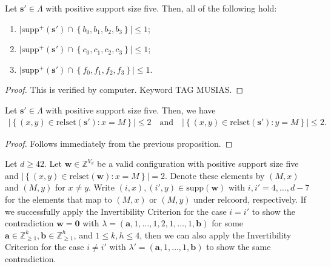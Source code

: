 \begin{proposition}
    Let \( \mathbf{s}' \in \Lambda \) with positive support size five. Then, all of the following hold:
    \begin{enumerate}
        \item \( \lvert \mathrm{supp}^+(\mathbf{s}') \cap \left\{ b_0,b_1,b_2,b_3 \right\} \rvert \leq 1 \);
        \item \( \lvert \mathrm{supp}^+(\mathbf{s}') \cap \left\{ c_0,c_1,c_2,c_3 \right\} \rvert \leq 1 \);
        \item \( \lvert \mathrm{supp}^+(\mathbf{s}') \cap \left\{ f_0,f_1,f_2,f_3 \right\} \rvert \leq 1 \).
    \end{enumerate}
\end{proposition}

\begin{proof}
    This is verified by computer. Keyword TAG MUSIAS.
\end{proof}

\begin{corollary}
    Let \( \mathbf{s}' \in \Lambda \) with positive support size five. Then, we have
    \begin{align*}
        \lvert \left\{ (x,y) \in \mathrm{relset}(\mathbf{s}') : x = M \right\} \rvert \leq 2 \quad \text{and} \quad         \lvert \left\{ (x,y) \in \mathrm{relset}(\mathbf{s}') : y = M \right\} \rvert \leq 2.
    \end{align*}
\end{corollary}

\begin{proof}
    Follows immediately from the previous proposition.
\end{proof}

\begin{proposition}
    Let \( d\geq 42 \).
    Let \( \mathbf{w} \in \mathbb{Z}^{V_d} \) be a valid configuration with positive support size five and \( \lvert \left\{ (x,y) \in \mathrm{relset}(\mathbf{w}) : x = M \right\} \rvert = 2 \).
    Denote these elements by \( (M, x) \) and \( (M, y) \) for \( x \neq y \). Write \( (i,x), (i',y) \in \mathrm{supp}(\mathbf{w}) \) with \( i,i' = 4, \dots, d-7 \) for the elements that map to \( (M, x) \) or \( (M, y) \) under \( \mathrm{relcoord} \), respectively. If we successfully apply the Invertibility Criterion for the case \( i = i' \) to show the contradiction \( \mathbf{w} = \mathbf 0 \) with \( \lambda = (\mathbf{a},1,\dots,1, 2, 1, \dots, 1, \mathbf{b}) \)
    for some \(\mathbf{a} \in \mathbb{Z}^{k}_{\geq 1}, \mathbf{b} \in \mathbb{Z}^{h}_{\geq 1} \), and \( 1 \leq k,h \leq 4 \), then we can also apply the Invertibility Criterion for the case \( i \neq i' \) with \( \lambda' = (\mathbf{a},1, \dots, 1, \mathbf{b}) \)
    to show the same contradiction.
\end{proposition}

